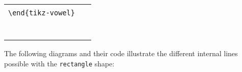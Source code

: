 \documentclass{article}
\begin{document}
\begin{center}
\begin{tabular}{ll}
  \begin{minipage}[t]{6.5cm}{\small
    \verb|\begin{tikz-vowel}[three]|\\
    \verb|\end{tikz-vowel}|\\}
  \end{minipage} & 
  \begin{minipage}[t]{6.5cm}
  {~}
  \end{minipage} \\
  \begin{minipage}[t]{6.5cm}{
  \begin{tikz-vowel}[three]\end{tikz-vowel} \\}\end{minipage} &
\end{tabular}
\end{center}

\noindent
The following diagrams and their code illustrate the different internal lines possible with the \texttt{rectangle} shape:
\end{document}

